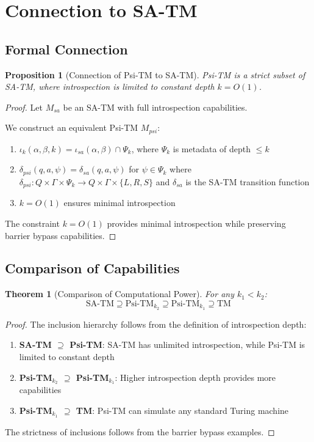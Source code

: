\documentclass[11pt]{article}
\newtheorem{theorem}{Theorem}
\newtheorem{proposition}{Proposition}
\begin{document}
\section{Connection to SA-TM}

\subsection{Formal Connection}

\begin{proposition}[Connection of Psi-TM to SA-TM]
Psi-TM is a strict subset of SA-TM, where introspection is limited to constant depth $k = O(1)$.
\end{proposition}

\begin{proof}
Let $M_{sa}$ be an SA-TM with full introspection capabilities.

We construct an equivalent Psi-TM $M_{psi}$:
\begin{enumerate}
\item $\iota_k(\alpha, \beta, k) = \iota_{sa}(\alpha, \beta) \cap \Psi_k$, where $\Psi_k$ is metadata of depth $\leq k$
\item $\delta_{psi}(q, a, \psi) = \delta_{sa}(q, a, \psi)$ for $\psi \in \Psi_k$ where $\delta_{psi}: Q \times \Gamma \times \Psi_k \to Q \times \Gamma \times \{L, R, S\}$ and $\delta_{sa}$ is the SA-TM transition function
\item $k = O(1)$ ensures minimal introspection
\end{enumerate}

The constraint $k = O(1)$ provides minimal introspection while preserving barrier bypass capabilities.
\end{proof}

\subsection{Comparison of Capabilities}

\begin{theorem}[Comparison of Computational Power]
For any $k_1 < k_2$:
$$\text{SA-TM} \supseteq \text{Psi-TM}_{k_2} \supseteq \text{Psi-TM}_{k_1} \supseteq \text{TM}$$
\end{theorem}

\begin{proof}
The inclusion hierarchy follows from the definition of introspection depth:

\begin{enumerate}
\item \textbf{SA-TM $\supseteq$ Psi-TM}: SA-TM has unlimited introspection, while Psi-TM is limited to constant depth
\item \textbf{Psi-TM$_{k_2}$ $\supseteq$ Psi-TM$_{k_1}$}: Higher introspection depth provides more capabilities
\item \textbf{Psi-TM$_{k_1}$ $\supseteq$ TM}: Psi-TM can simulate any standard Turing machine
\end{enumerate}

The strictness of inclusions follows from the barrier bypass examples.
\end{proof}
\end{document}
